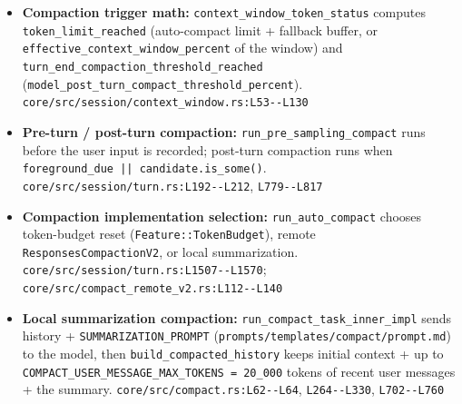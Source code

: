 \begin{itemize}
\item \textbf{Compaction trigger math:} \texttt{context\_\allowbreak{}window\_\allowbreak{}token\_\allowbreak{}status} computes \texttt{token\_\allowbreak{}limit\_\allowbreak{}reached} (auto-compact limit + fallback buffer, or \texttt{effective\_\allowbreak{}context\_\allowbreak{}window\_\allowbreak{}percent} of the window) and \texttt{turn\_\allowbreak{}end\_\allowbreak{}compaction\_\allowbreak{}threshold\_\allowbreak{}reached} (\texttt{model\_\allowbreak{}post\_\allowbreak{}turn\_\allowbreak{}compact\_\allowbreak{}threshold\_\allowbreak{}percent}). \texttt{core/\allowbreak{}src/\allowbreak{}session/\allowbreak{}context\_\allowbreak{}window.\allowbreak{}rs:\allowbreak{}L53-\allowbreak{}-\allowbreak{}L130}
\item \textbf{Pre-turn / post-turn compaction:} \texttt{run\_\allowbreak{}pre\_\allowbreak{}sampling\_\allowbreak{}compact} runs before the user input is recorded; post-turn compaction runs when \texttt{foreground\_\allowbreak{}due || candidate.\allowbreak{}is\_\allowbreak{}some(\allowbreak{})}. \texttt{core/\allowbreak{}src/\allowbreak{}session/\allowbreak{}turn.\allowbreak{}rs:\allowbreak{}L192-\allowbreak{}-\allowbreak{}L212}, \texttt{L779-\allowbreak{}-\allowbreak{}L817}
\item \textbf{Compaction implementation selection:} \texttt{run\_\allowbreak{}auto\_\allowbreak{}compact} chooses token-budget reset (\texttt{Feature:\allowbreak{}:\allowbreak{}TokenBudget}), remote \texttt{ResponsesCompactionV2}, or local summarization. \texttt{core/\allowbreak{}src/\allowbreak{}session/\allowbreak{}turn.\allowbreak{}rs:\allowbreak{}L1507-\allowbreak{}-\allowbreak{}L1570}; \texttt{core/\allowbreak{}src/\allowbreak{}compact\_\allowbreak{}remote\_\allowbreak{}v2.\allowbreak{}rs:\allowbreak{}L112-\allowbreak{}-\allowbreak{}L140}
\item \textbf{Local summarization compaction:} \texttt{run\_\allowbreak{}compact\_\allowbreak{}task\_\allowbreak{}inner\_\allowbreak{}impl} sends history + \texttt{SUMMARIZATION\_\allowbreak{}PROMPT} (\texttt{prompts/\allowbreak{}templates/\allowbreak{}compact/\allowbreak{}prompt.\allowbreak{}md}) to the model, then \texttt{build\_\allowbreak{}compacted\_\allowbreak{}history} keeps initial context + up to \texttt{COMPACT\_\allowbreak{}USER\_\allowbreak{}MESSAGE\_\allowbreak{}MAX\_\allowbreak{}TOKENS = 20\_\allowbreak{}000} tokens of recent user messages + the summary. \texttt{core/\allowbreak{}src/\allowbreak{}compact.\allowbreak{}rs:\allowbreak{}L62-\allowbreak{}-\allowbreak{}L64}, \texttt{L264-\allowbreak{}-\allowbreak{}L330}, \texttt{L702-\allowbreak{}-\allowbreak{}L760}

\end{itemize}

